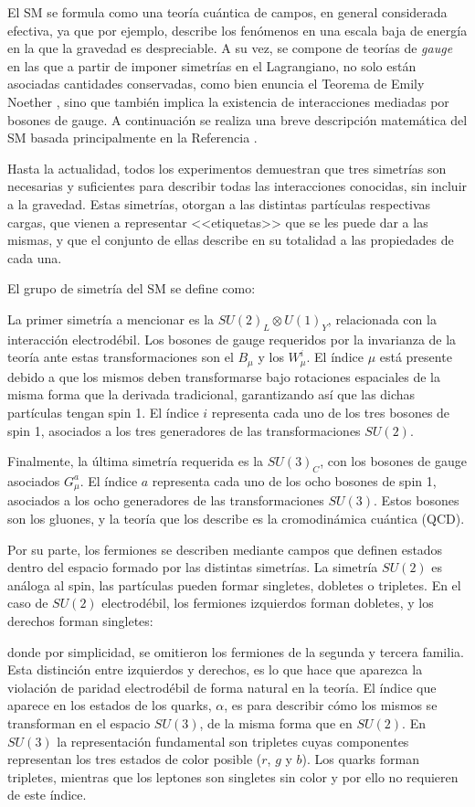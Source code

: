 El SM se formula como una teoría cuántica de campos, en general considerada efectiva, ya que por ejemplo, describe los fenómenos en una escala baja de energía en la que la gravedad es despreciable. A su vez, se compone de teorías de \textit{gauge} en las que a partir de imponer simetrías en el Lagrangiano, no solo están asociadas cantidades conservadas, como bien enuncia el Teorema de Emily Noether \cite{Noether1918}, sino que también implica la existencia de interacciones mediadas por bosones de gauge. A continuación se realiza una breve descripción matemática del SM basada principalmente en la Referencia \cite{gkane}.

Hasta la actualidad, todos los experimentos demuestran que tres simetrías son necesarias y suficientes para describir todas las interacciones conocidas, sin incluir a la gravedad. Estas simetrías, otorgan a las distintas partículas respectivas cargas, que vienen a representar <<etiquetas>> que se les puede dar a las mismas, y que el conjunto de ellas describe en su totalidad a las propiedades de cada una.

El grupo de simetría del SM se define como:


La primer simetría a mencionar es la $SU(2)_L \otimes U(1)_Y$, relacionada con la interacción electrodébil. Los bosones de gauge requeridos por la invarianza de la teoría ante estas transformaciones son el $B_{\mu}$ y los $W_{\mu}^{i}$. El índice $\mu$ está presente debido a que los mismos deben transformarse bajo rotaciones espaciales de la misma forma que la derivada tradicional, garantizando así que las dichas partículas tengan spin 1. El índice $i$ representa cada uno de los tres bosones de spin 1, asociados a los tres generadores de las transformaciones $SU(2)$.


Finalmente, la última simetría requerida es la $SU(3)_C$, con los bosones de gauge asociados $G_{\mu}^{a}$. El índice $a$ representa cada uno de los ocho bosones de spin 1, asociados a los ocho generadores de las transformaciones $SU(3)$. Estos bosones son los gluones, y la teoría que los describe es la cromodinámica cuántica (QCD).

Por su parte, los fermiones se describen mediante campos que definen estados dentro del espacio formado por las distintas simetrías. La simetría $SU(2)$ es análoga al spin, 
las partículas pueden formar singletes, dobletes o tripletes.
En el caso de $SU(2)$ electrodébil, los fermiones izquierdos forman dobletes, y los derechos forman singletes:


donde por simplicidad, se omitieron los fermiones de la segunda y tercera familia.
Esta distinción entre izquierdos y derechos, es lo que hace que aparezca la violación de paridad electrodébil de forma natural en la teoría. El índice que aparece en los estados de los quarks, $\alpha$, es para describir cómo los mismos se transforman en el espacio $SU(3)$, de la misma forma que en $SU(2)$. En $SU(3)$ la representación fundamental son tripletes cuyas componentes representan los tres estados de color posible ($r$, $g$ y $b$). Los quarks forman tripletes,  mientras que los leptones son singletes sin color y por ello no requieren de este índice.


